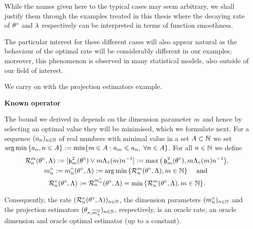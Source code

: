 While the names given here to the typical cases may seem arbitrary, we shall justify them through the examples treated in this thesis where the decaying rate of $\fxdf$ and $\fedf$ respectively can be interpreted in terms of function smoothness.

The particular interest for these different cases will also appear natural as the behaviour of the optimal rate will be considerably different in our examples; moreover, this phenomenon is observed in many statistical models, also outside of our field of interest.

We carry on with the projection estimators example.

\textbf{Known operator}

The bound we derived in  depends on the
dimension parameter $\Di$ and hence by selecting an optimal value they
will be minimised, which we formulate next.  For a sequence
$\Nsuite[n]{a_n}$ of real numbers with minimal value in a set
$A\subset{\Nz}$ we set
$\argmin\set{a_n,n\in A}:=\min\{m\in A:a_m\leq a_n,\;\forall n\in A
\}$. For all $n\in\Nz$ we define
\begin{multline}\label{oo:de:nra}
  \dRa{\Di}{\xdf,\Lambda}:=[\bias^2(\xdf)\vee\Di \oiSv \ssY^{-1}]
  :=\max\vectB{\bias^2(\xdf), \Di \oiSv \ssY^{-1}},\\
  \hfill
  \onDi:=\onDi(\xdf,\Lambda):=\argmin\Nset[{\Di\in\Nz}]{\dRa{\Di}{\xdf,\Lambda}}
  \quad\text{ and }\hfill\\
  \oRa{\xdf,\Lambda}:=\dRa{\onDi}{\xdf,\Lambda}=\min\Nset[{\Di\in\Nz}]{\dRa{\Di}{\xdf,\Lambda}}.
\end{multline}

\begin{te}
Consequently, the  rate $\Nsuite[\ssY]{\oRa{\xdf,\Lambda}}$, the dimension parameters $\Nsuite[\ssY]{\onDi}$  and  the projection estimators  $\Nsuite[\ssY]{\txdfPr[\onDi]}$, respectively, is an oracle
rate, an oracle dimension and oracle optimal estimator (up to a constant).
\end{te}


